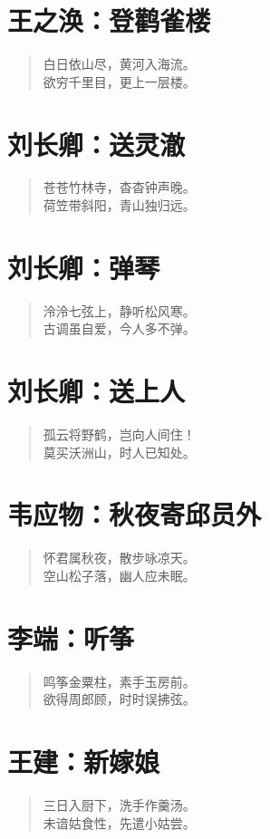 \documentclass[12pt,oneside]{book}
\newenvironment{shici}{%
\begin{verse}\centering\yanti\large\hspace{12pt}}{\end{verse}}
\begin{document}
\begin{common-format}
\chapter{王之涣：登鹳雀楼}
\begin{shici}
白日依山尽，黄河入海流。\\
欲穷千里目，更上一层楼。
\end{shici}

\chapter{刘长卿：送灵澈}
\begin{shici}
苍苍竹林寺，杳杳钟声晚。\\
荷笠带斜阳，青山独归远。
\end{shici}

\chapter{刘长卿：弹琴}
\begin{shici}
泠泠七弦上，静听松风寒。\\
古调虽自爱，今人多不弹。
\end{shici}

\chapter{刘长卿：送上人}
\begin{shici}
孤云将野鹤，岂向人间住！\\
莫买沃洲山，时人已知处。
\end{shici}

\chapter{韦应物：秋夜寄邱员外}
\begin{shici}
怀君属秋夜，散步咏凉天。\\
空山松子落，幽人应未眠。
\end{shici}

\chapter{李端：听筝}
\begin{shici}
鸣筝金粟柱，素手玉房前。\\
欲得周郎顾，时时误拂弦。
\end{shici}

\chapter{王建：新嫁娘}
\begin{shici}
三日入厨下，洗手作羹汤。\\
未谙姑食性，先遣小姑尝。
\end{shici}


\end{common-format}
\end{document}
